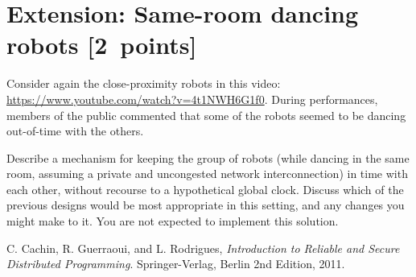 \documentclass[a4paper]{article}
\begin{document}
\section*{Extension: Same-room dancing robots [2~points]} %
\label{sec:extension_same_room_dancing_robots}

Consider again the close-proximity robots in this video:
\url{https://www.youtube.com/watch?v=4t1NWH6G1f0}. During performances,
members of the public commented that some of the robots seemed to be dancing
out-of-time with the others.

Describe a mechanism for keeping the group of
robots (while dancing in the same room, assuming a private and uncongested
network interconnection) in time with each other, without recourse to a
hypothetical global clock. Discuss which of the previous designs would be most
appropriate in this setting, and any changes you might make to it.
You are not expected to implement this solution.



















\begin{thebibliography}{9}

  C. Cachin, R. Guerraoui, and L. Rodrigues,
  \emph{Introduction to Reliable and Secure Distributed Programming}.
  Springer-Verlag, Berlin
  2nd Edition,
  2011.

\end{thebibliography}
\end{document}
